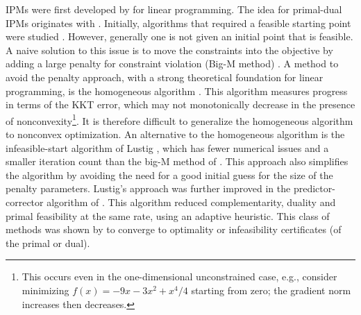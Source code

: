 \documentclass{article}
\begin{document}
IPMs were first developed by \citet*{karmarkar1984new} for linear programming. The idea for primal-dual IPMs originates with \citet*{megiddo1989pathways}. Initially, algorithms that required a feasible starting point were studied \cite{kojima1989primal,monteiro1989interior}. However, generally one is not given an initial point that is feasible. A naive solution to this issue is to move the constraints into the objective  by adding a large penalty for constraint violation (Big-M method) \cite{mcshane1989implementation}. A method to avoid the penalty approach, with a strong theoretical foundation for linear programming, is the homogeneous algorithm \cite{andersen1998computational,andersen1999homogeneous,ye1994nl}. This algorithm measures progress in terms of the KKT error, which may not monotonically decrease in the presence of nonconvexity\footnote{This occurs even in the one-dimensional unconstrained case, e.g., consider minimizing $f(x)=-9 x - 3 x^2 + x^4/4$ starting from zero; the gradient norm increases then decreases.}. It is therefore difficult to generalize the homogeneous algorithm to nonconvex optimization. An alternative to the homogeneous algorithm is the infeasible-start algorithm of Lustig \cite{lustig1990feasibility}, which has fewer numerical issues and a smaller iteration count than the big-M method of \cite{mcshane1989implementation}. This approach also simplifies the algorithm by avoiding the need for a good initial guess for the size of the penalty parameters. Lustig's approach was further improved in the predictor-corrector algorithm of \citet*{mehrotra1992implementation}. This algorithm reduced complementarity, duality and primal feasibility at the same rate, using an adaptive heuristic. This class of methods was shown by \citet*{todd2003detecting} to converge to optimality or infeasibility certificates (of the primal or dual). 
\end{document}
